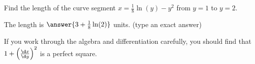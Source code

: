 \documentclass{ximera}
\author{Jim Talamo}
\begin{document}
\begin{exercise}

Find the length of the curve segment $x=\frac{1}{8} \ln(y)-y^2$ from $y=1$ to $y=2$.

The length is $\answer{3+\frac{1}{8} \ln(2)}$ units. (type an exact answer)


\begin{hint}
If you work through the algebra and differentiation carefully, you should find that $1+\left(\frac{\d x}{\d y}\right)^2$ is a perfect square. 
\end{hint}

\end{exercise}
\end{document}
